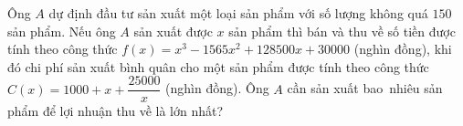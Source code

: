 \begin{bt}%
	Ông $A$ dự định đầu tư sản xuất một loại sản phẩm với số lượng không quá $150$ sản phẩm. Nếu ông $A$ sản xuất được $x$ sản phẩm thì bán và thu về số tiền được tính theo công thức $f(x)=x^3-1565x^2+128500x+30000$ (nghìn đồng), khi đó chi phí sản xuất bình quân cho một sản phẩm được tính theo công thức $C(x)=1000+x+\dfrac{25000}{x}$ (nghìn đồng). Ông $A$ cần sản xuất bao~nhiêu sản phẩm để lợi nhuận  thu về là lớn nhất?
\end{bt}

